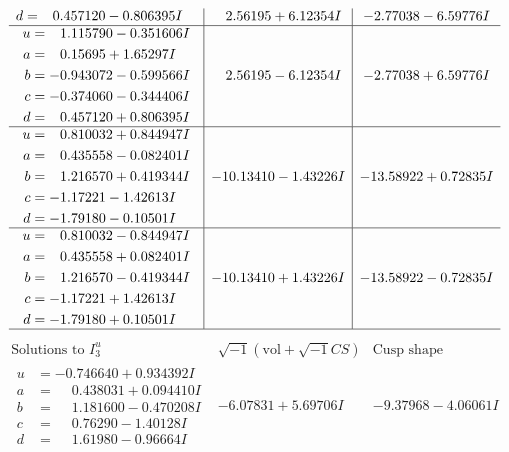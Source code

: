 \documentclass[1p]{elsarticle_modified}
\theoremstyle{definition}
\newcommand{\I}{\sqrt{-1}}
\begin{document}
$$\begin{array}{c|c|c}
\begin{aligned}
d &= \phantom{-}0.457120 - 0.806395 I\end{aligned}
 & \phantom{-}2.56195 + 6.12354 I & -2.77038 - 6.59776 I \\ \hline\begin{aligned}
u &= \phantom{-}1.115790 - 0.351606 I \\
a &= \phantom{-}0.15695 + 1.65297 I \\
b &= -0.943072 - 0.599566 I \\
c &= -0.374060 - 0.344406 I \\
d &= \phantom{-}0.457120 + 0.806395 I\end{aligned}
 & \phantom{-}2.56195 - 6.12354 I & -2.77038 + 6.59776 I \\ \hline\begin{aligned}
u &= \phantom{-}0.810032 + 0.844947 I \\
a &= \phantom{-}0.435558 - 0.082401 I \\
b &= \phantom{-}1.216570 + 0.419344 I \\
c &= -1.17221 - 1.42613 I \\
d &= -1.79180 - 0.10501 I\end{aligned}
 & -10.13410 - 1.43226 I & -13.58922 + 0.72835 I \\ \hline\begin{aligned}
u &= \phantom{-}0.810032 - 0.844947 I \\
a &= \phantom{-}0.435558 + 0.082401 I \\
b &= \phantom{-}1.216570 - 0.419344 I \\
c &= -1.17221 + 1.42613 I \\
d &= -1.79180 + 0.10501 I\end{aligned}
 & -10.13410 + 1.43226 I & -13.58922 - 0.72835 I\\
 \hline 
 \end{array}$$\newpage$$\begin{array}{c|c|c}  
\text{Solutions to }I^u_{3}& \I (\text{vol} + \sqrt{-1}CS) & \text{Cusp shape}\\
 \hline 
\begin{aligned}
u &= -0.746640 + 0.934392 I \\
a &= \phantom{-}0.438031 + 0.094410 I \\
b &= \phantom{-}1.181600 - 0.470208 I \\
c &= \phantom{-}0.76290 - 1.40128 I \\
d &= \phantom{-}1.61980 - 0.96664 I\end{aligned}
 & -6.07831 + 5.69706 I & -9.37968 - 4.06061 I \\ \hline\begin{aligned}

\end{aligned}
\end{array}$$
\end{document}
